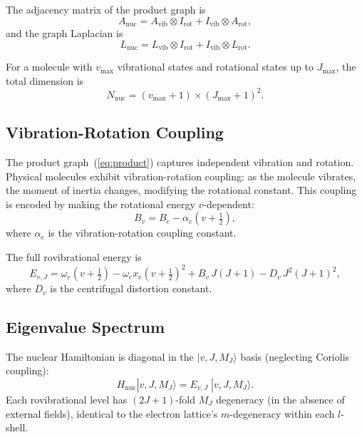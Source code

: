 \documentclass[aps,pra,twocolumn,superscriptaddress,longbibliography]{revtex4-2}
\begin{document}
The adjacency matrix of the product graph is
\begin{equation}
A_{\mathrm{nuc}} = A_{\mathrm{vib}} \otimes I_{\mathrm{rot}} +
I_{\mathrm{vib}} \otimes A_{\mathrm{rot}},
\label{eq:anuc}
\end{equation}
and the graph Laplacian is
\begin{equation}
L_{\mathrm{nuc}} = L_{\mathrm{vib}} \otimes I_{\mathrm{rot}} +
I_{\mathrm{vib}} \otimes L_{\mathrm{rot}}.
\label{eq:lnuc}
\end{equation}

For a molecule with $v_{\max}$ vibrational states and rotational states
up to $J_{\max}$, the total dimension is
\begin{equation}
N_{\mathrm{nuc}} = (v_{\max} + 1) \times (J_{\max} + 1)^2.
\end{equation}

\subsection{Vibration-Rotation Coupling}

The product graph~(\ref{eq:product}) captures independent vibration and
rotation.  Physical molecules exhibit vibration-rotation coupling: as
the molecule vibrates, the moment of inertia changes, modifying the
rotational constant.  This coupling is encoded by making the rotational
energy $v$-dependent:
\begin{equation}
B_v = B_e - \alpha_e\left(v + \tfrac{1}{2}\right),
\label{eq:bv}
\end{equation}
where $\alpha_e$ is the vibration-rotation coupling constant.

The full rovibrational energy is
\begin{equation}
E_{v,J} = \omega_e\left(v + \tfrac{1}{2}\right)
- \omega_e x_e\left(v + \tfrac{1}{2}\right)^2
+ B_v\,J(J+1) - D_v\,J^2(J+1)^2,
\label{eq:rovib}
\end{equation}
where $D_v$ is the centrifugal distortion constant.

\subsection{Eigenvalue Spectrum}

The nuclear Hamiltonian is diagonal in the $|v, J, M_J\rangle$ basis
(neglecting Coriolis coupling):
\begin{equation}
H_{\mathrm{nuc}}|v, J, M_J\rangle = E_{v,J}\;|v, J, M_J\rangle.
\label{eq:hnuc}
\end{equation}
Each rovibrational level has $(2J+1)$-fold $M_J$ degeneracy (in the
absence of external fields), identical to the electron lattice's
$m$-degeneracy within each $l$-shell.
\end{document}
